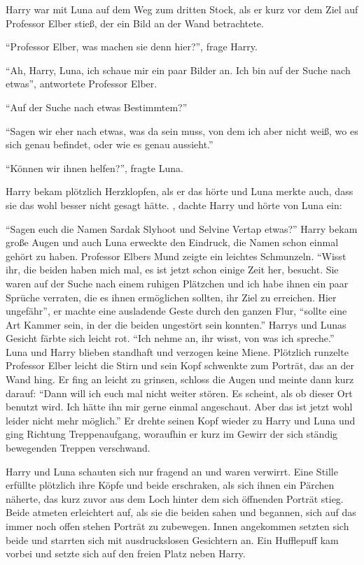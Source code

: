 \trenn

Harry war mit Luna auf dem Weg zum dritten Stock, als er kurz vor dem Ziel auf Professor Elber stieß, der ein Bild an der Wand betrachtete.

\enquote{Professor Elber, was machen sie denn hier?}, frage Harry.

\enquote{Ah, Harry, Luna, ich schaue mir ein paar Bilder an. Ich bin auf der Suche nach etwas}, antwortete Professor Elber.

\enquote{Auf der Suche nach etwas Bestimmtem?}

\enquote{Sagen wir eher nach etwas, was da sein muss, von dem ich aber nicht weiß, wo es sich genau befindet, oder wie es genau aussieht.}

\enquote{Können wir ihnen helfen?}, fragte Luna.

Harry bekam plötzlich Herzklopfen, als er das hörte und Luna merkte auch, dass sie das wohl besser nicht gesagt hätte. , dachte Harry und hörte von Luna ein: 

\enquote{Sagen euch die Namen Sardak Slyhoot und Selvine Vertap etwas?} Harry bekam große Augen und auch Luna erweckte den Eindruck, die Namen schon einmal gehört zu haben. Professor Elbers Mund zeigte ein leichtes Schmunzeln. \enquote{Wisst ihr, die beiden haben mich mal, es ist jetzt schon einige Zeit her, besucht. Sie waren auf der Suche nach einem ruhigen Plätzchen und ich habe ihnen ein paar Sprüche verraten, die es ihnen ermöglichen sollten, ihr Ziel zu erreichen. Hier ungefähr}, er machte eine ausladende Geste durch den ganzen Flur, \enquote{sollte eine Art Kammer sein, in der die beiden ungestört sein konnten.} Harrys und Lunas Gesicht färbte sich leicht rot. \enquote{Ich nehme an, ihr wisst, von was ich spreche.} Luna und Harry blieben standhaft und verzogen keine Miene. Plötzlich runzelte Professor Elber leicht die Stirn und sein Kopf schwenkte zum Porträt, das an der Wand hing. Er fing an leicht zu grinsen, schloss die Augen und meinte dann kurz darauf: \enquote{Dann will ich euch mal nicht weiter stören. Es scheint, als ob dieser Ort benutzt wird. Ich hätte ihn mir gerne einmal angeschaut. Aber das ist jetzt wohl leider nicht mehr möglich.} Er drehte seinen Kopf wieder zu Harry und Luna und ging Richtung Treppenaufgang, woraufhin er kurz im Gewirr der sich ständig bewegenden Treppen verschwand.

Harry und Luna schauten sich nur fragend an und waren verwirrt. Eine Stille erfüllte plötzlich ihre Köpfe und beide erschraken, als sich ihnen ein Pärchen näherte, das kurz zuvor aus dem Loch hinter dem sich öffnenden Porträt stieg. Beide atmeten erleichtert auf, als sie die beiden sahen und begannen, sich auf das immer noch offen stehen Porträt zu zubewegen. Innen angekommen setzten sich beide und starrten sich mit ausdruckslosen Gesichtern an. Ein Hufflepuff kam vorbei und setzte sich auf den freien Platz neben Harry.

